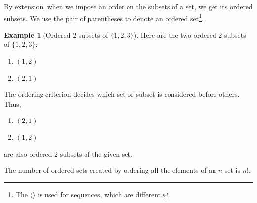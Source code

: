 \documentclass[11pt]{book}
\theoremstyle{definition}
\theoremstyle{plain}
\theoremstyle{definition}
\newtheorem{example}{Example}
\theoremstyle{problemstyle}
\theoremstyle{remark}
\theoremstyle{definition}
\begin{document}
By extension, when we impose an order on the subsets of a set, we get its ordered subsets. We use the pair of parentheses to denote an ordered set\footnote{The $\langle\rangle$ is used for sequences, which are different.}.
\begin{example}[Ordered $2$-subsets of $\{1,2,3\}$]
    Here are the two ordered $2$-subsets of $\{1,2,3\}$:
    \begin{enumerate}
        \item $(1,2)$
        \item $(2,1)$
    \end{enumerate}
    The ordering criterion decides which set or subset is considered before others. Thus,
    \begin{enumerate}
        \item $(2,1)$
        \item $(1,2)$
    \end{enumerate}

    are also ordered $2$-subsets of the given set.

    The number of ordered sets created by ordering all the elements of an $n$-set is $n!$.
\end{example}
\end{document}
